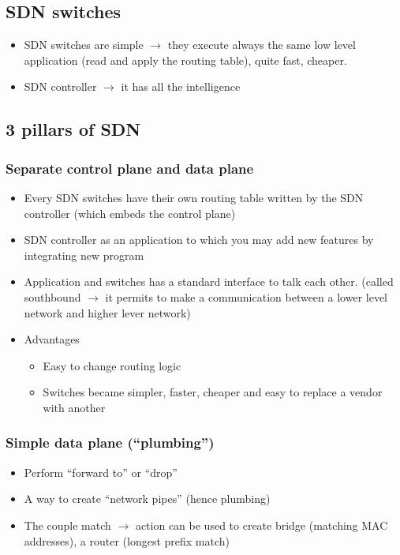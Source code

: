 \documentclass{article}
\begin{document}
\subsection{SDN switches}
\begin{itemize}
    \item SDN switches are simple $\rightarrow$ they execute always the same low level application (read and apply the routing table), quite fast, cheaper.
    \item SDN controller $\rightarrow$ it has all the intelligence
\end{itemize}

\subsection{3 pillars of SDN}
\subsubsection{Separate control plane and data plane}
  \begin{itemize}
    \item Every SDN switches have their own routing table written by the SDN controller (which embeds the control plane)
    \item SDN controller as an application to which you may add new features by integrating new program
    \item Application and switches has a standard interface to talk each other. (called southbound $\rightarrow$ it permits to make a communication between a lower level network and higher lever network)
    \item Advantages
      \begin{itemize}
        \item Easy to change routing logic
        \item Switches became simpler, faster, cheaper and easy to replace a vendor with another 
      \end{itemize}
  \end{itemize}

\subsubsection{Simple data plane (“plumbing”)}
  \begin{itemize}
    \item Perform “forward to” or “drop”
    \item A way to create “network pipes” (hence plumbing)
    \item The couple match $\rightarrow$ action can be used to create bridge (matching MAC addresses), a router (longest prefix match)
  \end{itemize}
\end{document}
